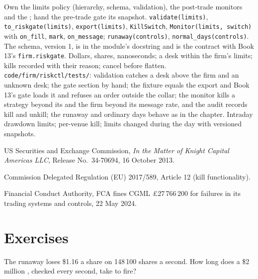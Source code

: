\begin{build}
 Own the limits policy (hierarchy, schema, validation), the post-trade monitors and the ; hand the pre-trade gate its
snapshot.
 \texttt{validate(limits)}, \texttt{to\_riskgate(limits)}, \texttt{export(limits)}, \texttt{KillSwitch}, \texttt{Monitor(limits,
switch)} with \texttt{on\_fill}, \texttt{mark}, \texttt{on\_message}; \texttt{runaway(controls)}, \texttt{normal\_days(controls)}. The schema,
version 1, is in the module's docstring and is the contract with Book 13's \texttt{firm.riskgate}.
 Dollars, shares, nanoseconds; a desk within the firm's limits; kills recorded with their reason; cancel before flatten.
 \texttt{code/firm/riskctl/tests/}: validation catches a desk above the firm and an unknown desk; the gate section by hand;
the fixture equals the export and Book 13's gate loads it and refuses an order outside the collar; the monitor kills a strategy beyond its 
and the firm beyond its message rate, and the audit records kill and unkill; the runaway and ordinary days behave as in the chapter.
 Intraday drawdown limits; per-venue kill; limits changed during the day with versioned snapshots.
\end{build}

\begin{omsources}
\item US Securities and Exchange Commission, \emph{In the Matter of Knight Capital Americas LLC}, Release No.\ 34-70694, 16 October 2013.
\item Commission Delegated Regulation (EU) 2017/589, Article 12 (kill functionality).
\item Financial Conduct Authority, FCA fines CGML £27\,766\,200 for failures in its trading systems and controls, 22 May 2024.
\end{omsources}

\section{Exercises}

\begin{exercise}[$\star$]\label{exo:hf:risk-controls:1}
The runaway loses \$1.16 a share on 148\,100 shares a second. How long does a \$2 million , checked every second, take to fire?
\end{exercise}

